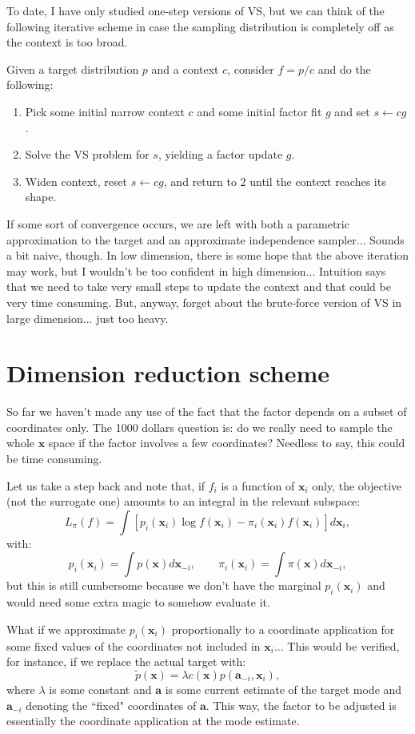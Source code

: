 \documentclass{article}
\def\x{{\mathbf{x}}}
\def\a{{\mathbf{a}}}
\begin{document}
To date, I have only studied one-step versions of VS, but we can think of the following iterative scheme in case the sampling distribution is completely off as the context is too broad.

Given a target distribution $p$ and a context $c$, consider $f=p/c$ and do the following:
\begin{enumerate}
\item Pick some initial narrow context $c$ and some initial factor fit $g$ and set $s\leftarrow c g$.
\item Solve the VS problem for $s$, yielding a factor update $g$.
\item Widen context, reset $s\leftarrow c g$, and return to 2 until the context reaches its shape.
\end{enumerate}

If some sort of convergence occurs, we are left with both a parametric approximation to the target and an approximate independence sampler... Sounds a bit naive, though. In low dimension, there is some hope that the above iteration may work, but I wouldn't be too confident in high dimension... Intuition says that we need to take very small steps to update the context and that could be very time consuming. But, anyway, forget about the brute-force version of VS in large dimension... just too heavy. 


\section{Dimension reduction scheme}

So far we haven't made any use of the fact that the factor depends on a subset of coordinates only. The 1000 dollars question is: do we really need to sample the whole $\x$ space if the factor involves a few coordinates? Needless to say, this could be time consuming. 

Let us take a step back and note that, if $f_i$ is a function of $\x_i$ only, the objective (not the surrogate one) amounts to an integral in the relevant subspace:
$$
L_\pi(f) = \int [ p_i(\x_i) \log f(\x_i)  - \pi_i(\x_i) f(\x_i) ] d\x_i,
$$
with:
$$
p_i(\x_i) = \int p(\x) d\x_{-i},
\qquad
\pi_i(\x_i) = \int \pi(\x) d\x_{-i}
,
$$
but this is still cumbersome because we don't have the marginal $p_i(\x_i)$ and would need some extra magic to somehow evaluate it.

What if we approximate $p_i(\x_i)$ proportionally to a coordinate application for some fixed values of the coordinates not included in $\x_i$... This would be verified, for instance, if we replace the actual target with:
$$
\tilde{p}(\x) = \lambda c(\x) p(\a_{-i}, \x_i),
$$
where $\lambda$ is some constant and $\a$ is some current estimate of the target mode and $\a_{-i}$ denoting the ``fixed" coordinates of $\a$. This way, the factor to be adjusted is essentially the coordinate application at the mode estimate.
\end{document}

